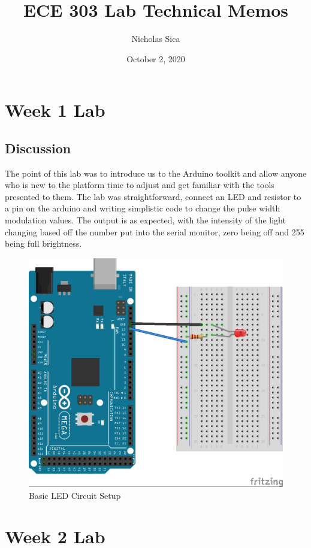 \documentclass[12pt,titlepage]{article}
\begin{document}
\title{ECE 303 Lab Technical Memos}
\author{Nicholas Sica}
\date{October 2, 2020}
\maketitle

\tableofcontents
\newpage

\section{Week 1 Lab}
\subsection{Discussion}
The point of this lab was to introduce us to the Arduino toolkit and allow anyone who is new to the platform time to adjust and get familiar with the tools presented to them. The lab was straightforward, connect an LED and resistor to a pin on the arduino and writing simplistic code to change the pulse width modulation values. The output is as expected, with the intensity of the light changing based off the number put into the serial monitor, zero being off and 255 being full brightness.
\begin{figure}[!htb]
  \centering
  \includegraphics[width=5.0in]{figure_1_1.png}
  \caption{Basic LED Circuit Setup}\label{fig:lab_2}
\end{figure}
\newpage
\section{Week 2 Lab}
\end{document}
